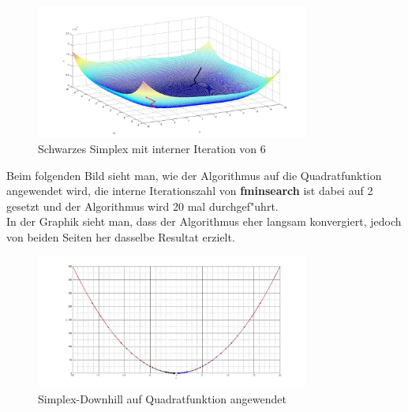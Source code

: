 \begin{figure}[h]
	\centering
	\includegraphics[width=0.8\textwidth]{../bilder/Himmelblau3DSchwarz.jpg}%
  	\caption{Schwarzes Simplex mit interner Iteration von 6}%
	\label{fig:HB3}%
\end{figure}

Beim folgenden Bild sieht man, wie der Algorithmus auf die Quadratfunktion angewendet wird, die interne Iterationszahl von \textbf{fminsearch} ist dabei auf 2 gesetzt und der Algorithmus wird 20 mal durchgef"uhrt.\\
In der Graphik sieht man, dass der Algorithmus eher langsam konvergiert, jedoch von beiden Seiten her dasselbe Resultat erzielt. 
\begin{figure}[h]
	\centering
	\includegraphics[width=0.8\textwidth]{../bilder/Quadrat.jpg}%
  	\caption{Simplex-Downhill auf Quadratfunktion angewendet}%
	\label{fig:SQ1}%
\end{figure}
